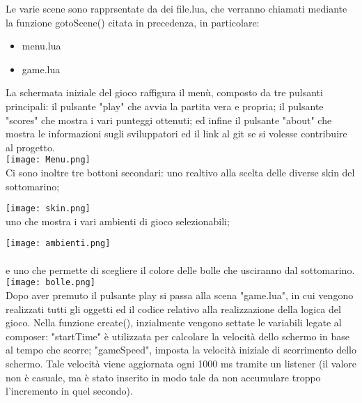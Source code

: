 \documentclass[12pt]{article}
\begin{document}
Le varie scene sono rapprsentate da dei file.lua, che verranno chiamati mediante la funzione gotoScene() citata in precedenza, in particolare:
\begin{itemize}
    \item menu.lua
    \item game.lua
\end{itemize}



La schermata iniziale del gioco raffigura il menù, composto da tre pulsanti principali: il pulsante "play" che avvia la partita vera e propria; il pulsante "scores" che mostra i vari punteggi ottenuti; ed infine il pulsante "about" che mostra le informazioni sugli sviluppatori ed il link al git se si volesse contribuire al progetto. \\

\texttt{[image: Menu.png]}\\
Ci sono inoltre tre bottoni secondari: uno realtivo alla scelta delle diverse skin del sottomarino; 

\texttt{[image: skin.png]}\\

uno che mostra i vari ambienti di gioco selezionabili; 

\texttt{[image: ambienti.png]}\\
\\
e uno che permette di scegliere il colore delle bolle che usciranno dal sottomarino. 
\\

\texttt{[image: bolle.png]}\\

Dopo aver premuto il pulsante play si passa alla scena "game.lua", in cui vengono realizzati tutti gli oggetti ed il codice relativo alla realizzazione della logica del gioco. 
Nella funzione create(), inzialmente vengono settate le variabili legate al composer: "startTime" 
è utilizzata per calcolare la velocità dello schermo in base al tempo che scorre; "gameSpeed", 
imposta la velocità iniziale di scorrimento dello schermo. Tale velocità viene aggiornata ogni 1000 ms 
tramite un listener (il valore non è casuale, ma è stato inserito in modo tale da non accumulare troppo l'incremento in quel secondo).
\end{document}
